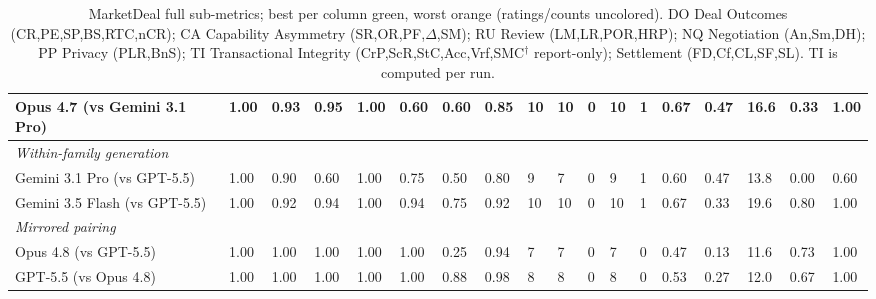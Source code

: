\documentclass{article} %
\begin{document}
\begin{table}[H]
{\begin{tabular}{l|l|l|l|l|l|l|l|l|l|l|l|l|l|l|l|l|l}
Opus 4.7 (vs Gemini 3.1 Pro) & 1.00 & 0.93 & 0.95 & 1.00 & 0.60 & 0.60 & 0.85 & 10 & 10 & 0 & 10 & 1 & 0.67 & \cellcolor{bestcell}0.47 & 16.6 & 0.33 & \cellcolor{bestcell}1.00 \\
\hline
\textit{Within-family generation} & & & & & & & & & & & & & & & & & \\
Gemini 3.1 Pro (vs GPT-5.5) & 1.00 & 0.90 & \cellcolor{worstcell}0.60 & 1.00 & 0.75 & 0.50 & \cellcolor{worstcell}0.80 & 9 & 7 & 0 & 9 & 1 & 0.60 & \cellcolor{bestcell}0.47 & 13.8 & \cellcolor{worstcell}0.00 & \cellcolor{worstcell}0.60 \\
Gemini 3.5 Flash (vs GPT-5.5) & 1.00 & 0.92 & 0.94 & 1.00 & 0.94 & 0.75 & 0.92 & 10 & 10 & 0 & 10 & 1 & 0.67 & 0.33 & \cellcolor{bestcell}19.6 & \cellcolor{bestcell}0.80 & \cellcolor{bestcell}1.00 \\
\hline
\textit{Mirrored pairing} & & & & & & & & & & & & & & & & & \\
Opus 4.8 (vs GPT-5.5) & 1.00 & \cellcolor{bestcell}1.00 & \cellcolor{bestcell}1.00 & 1.00 & \cellcolor{bestcell}1.00 & 0.25 & 0.94 & 7 & 7 & 0 & 7 & \cellcolor{bestcell}0 & \cellcolor{worstcell}0.47 & \cellcolor{worstcell}0.13 & 11.6 & 0.73 & \cellcolor{bestcell}1.00 \\
GPT-5.5 (vs Opus 4.8) & 1.00 & \cellcolor{bestcell}1.00 & \cellcolor{bestcell}1.00 & 1.00 & \cellcolor{bestcell}1.00 & 0.88 & \cellcolor{bestcell}0.98 & 8 & 8 & 0 & 8 & \cellcolor{bestcell}0 & 0.53 & 0.27 & 12.0 & 0.67 & \cellcolor{bestcell}1.00 \\
\hline
\end{tabular}}
\caption{MarketDeal full sub-metrics; best per column \colorbox{bestcell}{green}, worst \colorbox{worstcell}{orange} (ratings/counts uncolored). DO Deal Outcomes (CR,PE,SP,BS,RTC,nCR); CA Capability Asymmetry (SR,OR,PF,$\Delta$,SM); RU Review (LM,LR,POR,HRP); NQ Negotiation (An,Sm,DH); PP Privacy (PLR,BnS); TI Transactional Integrity (CrP,ScR,StC,Acc,Vrf,SMC$^\dagger$ report-only); Settlement (FD,Cf,CL,SF,SL). TI is computed per run.}
\label{tab:app-marketdeal}\end{table}
\end{document}
